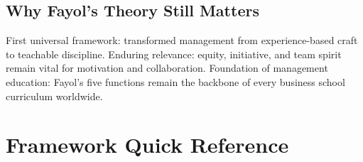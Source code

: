 \documentclass[11pt, letterpaper]{article}
\begin{document}
\subsection{Why Fayol's Theory Still Matters}

First universal framework: transformed management from experience-based craft to teachable discipline. Enduring relevance: equity, initiative, and team spirit remain vital for motivation and collaboration. Foundation of management education: Fayol's five functions remain the backbone of every business school curriculum worldwide.

\newpage

\section{Framework Quick Reference}
\end{document}
